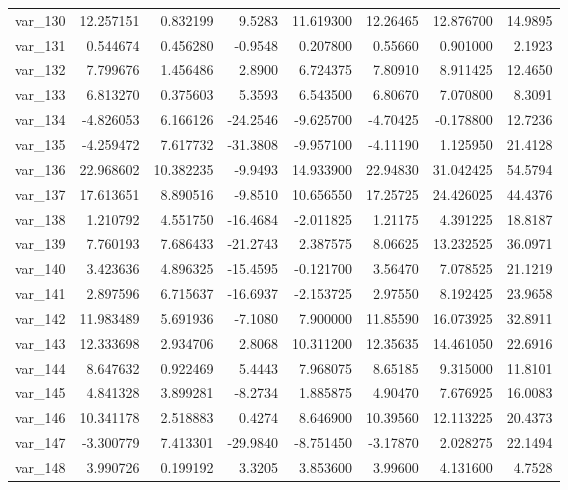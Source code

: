 \documentclass[12pt]{article}
\begin{document}
\begin{longtable}{lrrrrrrr}
 var\_130 &  12.257151 &   0.832199 &   9.5283 &  11.619300 &  12.26465 &  12.876700 &  14.9895 \\
 var\_131 &   0.544674 &   0.456280 &  -0.9548 &   0.207800 &   0.55660 &   0.901000 &   2.1923 \\
 var\_132 &   7.799676 &   1.456486 &   2.8900 &   6.724375 &   7.80910 &   8.911425 &  12.4650 \\
 var\_133 &   6.813270 &   0.375603 &   5.3593 &   6.543500 &   6.80670 &   7.070800 &   8.3091 \\
 var\_134 &  -4.826053 &   6.166126 & -24.2546 &  -9.625700 &  -4.70425 &  -0.178800 &  12.7236 \\
 var\_135 &  -4.259472 &   7.617732 & -31.3808 &  -9.957100 &  -4.11190 &   1.125950 &  21.4128 \\
 var\_136 &  22.968602 &  10.382235 &  -9.9493 &  14.933900 &  22.94830 &  31.042425 &  54.5794 \\
 var\_137 &  17.613651 &   8.890516 &  -9.8510 &  10.656550 &  17.25725 &  24.426025 &  44.4376 \\
 var\_138 &   1.210792 &   4.551750 & -16.4684 &  -2.011825 &   1.21175 &   4.391225 &  18.8187 \\
 var\_139 &   7.760193 &   7.686433 & -21.2743 &   2.387575 &   8.06625 &  13.232525 &  36.0971 \\
 var\_140 &   3.423636 &   4.896325 & -15.4595 &  -0.121700 &   3.56470 &   7.078525 &  21.1219 \\
 var\_141 &   2.897596 &   6.715637 & -16.6937 &  -2.153725 &   2.97550 &   8.192425 &  23.9658 \\
 var\_142 &  11.983489 &   5.691936 &  -7.1080 &   7.900000 &  11.85590 &  16.073925 &  32.8911 \\
 var\_143 &  12.333698 &   2.934706 &   2.8068 &  10.311200 &  12.35635 &  14.461050 &  22.6916 \\
 var\_144 &   8.647632 &   0.922469 &   5.4443 &   7.968075 &   8.65185 &   9.315000 &  11.8101 \\
 var\_145 &   4.841328 &   3.899281 &  -8.2734 &   1.885875 &   4.90470 &   7.676925 &  16.0083 \\
 var\_146 &  10.341178 &   2.518883 &   0.4274 &   8.646900 &  10.39560 &  12.113225 &  20.4373 \\
 var\_147 &  -3.300779 &   7.413301 & -29.9840 &  -8.751450 &  -3.17870 &   2.028275 &  22.1494 \\
 var\_148 &   3.990726 &   0.199192 &   3.3205 &   3.853600 &   3.99600 &   4.131600 &   4.7528 \\

\end{longtable}
\end{document}
